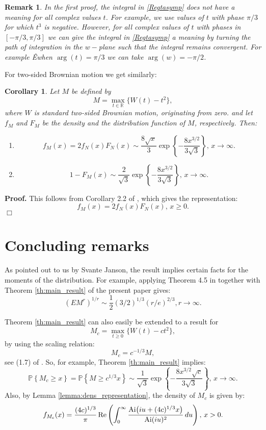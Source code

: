\documentclass[11pt]{article}
\newtheorem{corollary}{Corollary}[section]
\newtheorem{remark}{Remark}[section]
\begin{document}
\bigskip
\begin{remark}\label{rem_meaning}
{\rm In the first proof, the integral in \eqref{Regtasymp} does not have a meaning for all complex values $t$. For example, we use values of $t$ with phase $\pi/3$ for which $t^3$ is negative. However, for all complex values of $t$ with phases in $[-\pi/3,\pi/3]$ we can give the integral in \eqref{Regtasymp} a meaning by turning the path of integration in the $w-$plane such that the integral remains convergent. For example Êwhen $\arg(t)=\pi/3$ we can take $\arg(w)=-\pi/2$.
}
\end{remark}

For two-sided Brownian motion we get similarly:

\begin{corollary}
\label{cor:2-sided}
Let $M$ be defined by
$$
M=\max_{t\in{\mathbb R}}\{W(t)-t^2\},
$$
where $W$ is standard two-sided Brownian motion, originating from zero.
and let $f_M$ and $F_M$ be the density and the distribution function of $M$, respectively. Then:
\begin{enumerate}
\item[(i)]
$$
f_M(x)=2f_N(x)F_N(x)\sim \frac{8\sqrt{x}}{3}\exp\left\{-\frac{8x^{3/2}}{3\sqrt{3}}\right\},\,x\to\infty.
$$
\item[(ii)]
$$
1-F_M(x)\sim \frac2{\sqrt{3}}\exp\left\{-\frac{8x^{3/2}}{3\sqrt{3}}\right\},\,x\to\infty.
$$
\end{enumerate}
\end{corollary}

\noindent
{\bf Proof.} This follows from Corollary 2.2 of {{\small \sc {}}}, which gives the representation:
$$
f_M(x)=2f_N(x)F_N(x),\,x\ge0.
$$
{\hfill\mbox{$\Box$}\newline}

\section{Concluding remarks}
\label{section:conclusion}
As pointed out to us by Svante Janson, the result implies certain facts for the moments of the distribution. For example, applying Theorem 4.5 in {{\small \sc {}}} together with Theorem \ref{th:main_result} of the present paper gives:
$$
(E M^r)^{1/r}\sim \frac12 (3/2)^{1/3} (r/e)^{2/3}, r\to\infty.
$$

Theorem \ref{th:main_result} can also easily be extended to a result for
$$
M_c=\max_{t\ge0}\{W(t)-ct^2\},
$$
by using the scaling relation:
$$
M_c=c^{-1/3}M,
$$
see (1.7) of {{\small \sc {}}}. So, for example, Theorem \ref{th:main_result} implies:
$$
{{\mathbb P}}\left\{M_c\ge x\right\}={{\mathbb P}}\left\{M\ge c^{1/3}x\right\}\sim
\frac1{\sqrt{3}}\exp\left\{-\frac{8x^{3/2}\sqrt{c}}{3\sqrt{3}}\right\},\,x\to\infty.
$$
Also, by Lemma \ref{lemma:dens_representation}, the density of $M_c$ is given by:
\begin{equation}
\label{density_representation4}
f_{M_c}(x)=\frac{(4c)^{1/3}}{\pi}\,\mbox{\rm Re}\left(\int_0^{\infty}\frac{{\mbox{Ai}}\bigl(iu+(4c)^{1/3}x\bigr)}{{\mbox{Ai}}(iu)^2}\,du\right),\,x>0.
\end{equation}
\end{document}
